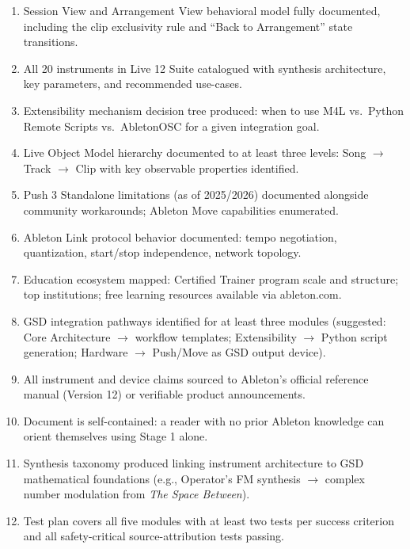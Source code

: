 \documentclass[11pt,letterpaper]{article}
\begin{document}
\begin{enumerate}
  \item Session View and Arrangement View behavioral model fully documented, including the
  clip exclusivity rule and ``Back to Arrangement'' state transitions.

  \item All 20 instruments in Live 12 Suite catalogued with synthesis architecture, key
  parameters, and recommended use-cases.

  \item Extensibility mechanism decision tree produced: when to use M4L vs.\ Python Remote
  Scripts vs.\ AbletonOSC for a given integration goal.

  \item Live Object Model hierarchy documented to at least three levels: Song $\to$ Track $\to$
  Clip with key observable properties identified.

  \item Push 3 Standalone limitations (as of 2025/2026) documented alongside community
  workarounds; Ableton Move capabilities enumerated.

  \item Ableton Link protocol behavior documented: tempo negotiation, quantization, start/stop
  independence, network topology.

  \item Education ecosystem mapped: Certified Trainer program scale and structure; top
  institutions; free learning resources available via ableton.com.

  \item GSD integration pathways identified for at least three modules (suggested: Core
  Architecture $\to$ workflow templates; Extensibility $\to$ Python script generation;
  Hardware $\to$ Push/Move as GSD output device).

  \item All instrument and device claims sourced to Ableton's official reference manual
  (Version 12) or verifiable product announcements.

  \item Document is self-contained: a reader with no prior Ableton knowledge can orient
  themselves using Stage 1 alone.

  \item Synthesis taxonomy produced linking instrument architecture to GSD mathematical
  foundations (e.g., Operator's FM synthesis $\to$ complex number modulation from
  \textit{The Space Between}).

  \item Test plan covers all five modules with at least two tests per success criterion
  and all safety-critical source-attribution tests passing.
\end{enumerate}
\end{document}
